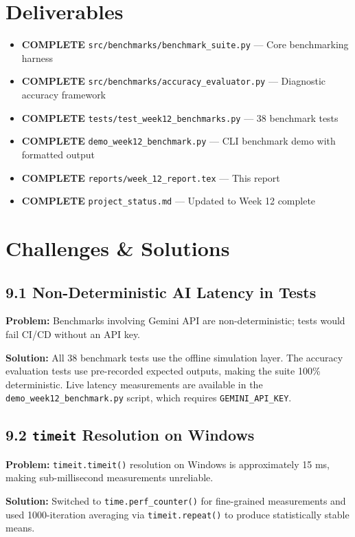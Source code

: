 \documentclass[a4paper,11pt]{article}
\newcommand{\statusgood}[1]{\colorbox{green!20}{\textbf{#1}}}
\begin{document}
\section{Deliverables}

\begin{itemize}[leftmargin=*]
    \item \statusgood{COMPLETE} \texttt{src/benchmarks/benchmark\_suite.py} --- Core benchmarking harness
    \item \statusgood{COMPLETE} \texttt{src/benchmarks/accuracy\_evaluator.py} --- Diagnostic accuracy framework
    \item \statusgood{COMPLETE} \texttt{tests/test\_week12\_benchmarks.py} --- 38 benchmark tests
    \item \statusgood{COMPLETE} \texttt{demo\_week12\_benchmark.py} --- CLI benchmark demo with formatted output
    \item \statusgood{COMPLETE} \texttt{reports/week\_12\_report.tex} --- This report
    \item \statusgood{COMPLETE} \texttt{project\_status.md} --- Updated to Week 12 complete
\end{itemize}

\section{Challenges \& Solutions}

\subsection{9.1 Non-Deterministic AI Latency in Tests}
\textbf{Problem:} Benchmarks involving Gemini API are non-deterministic; tests would fail CI/CD without an API key.

\textbf{Solution:} All 38 benchmark tests use the offline simulation layer. The accuracy evaluation tests use pre-recorded expected outputs, making the suite 100\% deterministic. Live latency measurements are available in the \texttt{demo\_week12\_benchmark.py} script, which requires \texttt{GEMINI\_API\_KEY}.

\subsection{9.2 \texttt{timeit} Resolution on Windows}
\textbf{Problem:} \texttt{timeit.timeit()} resolution on Windows is approximately 15 ms, making sub-millisecond measurements unreliable.

\textbf{Solution:} Switched to \texttt{time.perf\_counter()} for fine-grained measurements and used 1000-iteration averaging via \texttt{timeit.repeat()} to produce statistically stable means.
\end{document}
